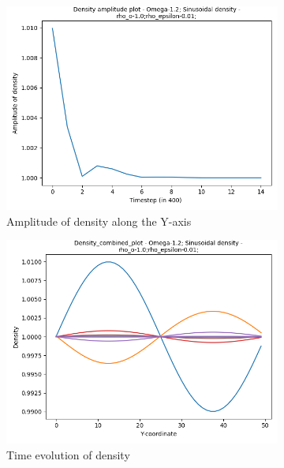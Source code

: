\documentclass[a4paper,11pt]{report}
\begin{document}
\begin{figure}[h!]
\centering
  \begin{subfigure}{0.3\textwidth}
        \includegraphics[width=\linewidth]{HPC_report/images/shear_wave_decay/sinusoidal_density/Amplitude-Timestep (in 400) -Amplitude of density.png}
        \caption{Amplitude of density along the Y-axis}
    \end{subfigure}
    \begin{subfigure}{0.3\textwidth}
        \includegraphics[width=\linewidth]{HPC_report/images/shear_wave_decay/sinusoidal_density/Combined_plot-Y-coordinate-Density.png}
        \caption{Time evolution of density}
    \end{subfigure}
    \begin{subfigure}{0.3\textwidth}

\end{subfigure}
\end{figure}
\end{document}
